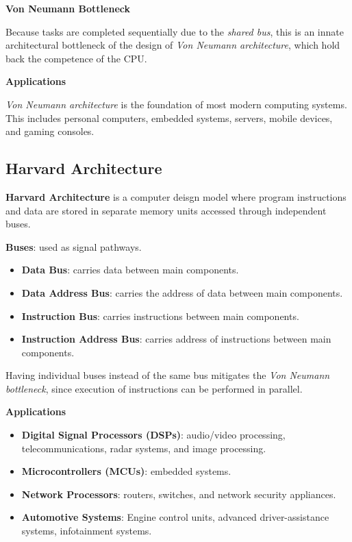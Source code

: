 \documentclass[12pt, letterpaper]{article}
\begin{document}
\textbf{Von Neumann Bottleneck}

Because tasks are completed sequentially due to the \textit{shared bus}, this is an innate architectural bottleneck of the design of \textit{Von Neumann architecture}, which hold back the competence of the CPU.
\medskip

\textbf{Applications}

\textit{Von Neumann architecture} is the foundation of most modern computing systems. This includes personal computers, embedded systems, servers, mobile devices, and gaming consoles.

\subsection*{Harvard Architecture}

\textbf{Harvard Architecture} is a computer deisgn model where program instructions and data are stored in separate memory units accessed through independent buses.
\medskip

\textbf{Buses}: used as signal pathways.

\begin{itemize}
    \item \textbf{Data Bus}: carries data between main components.
    \item \textbf{Data Address Bus}: carries the address of data between main components.
    \item \textbf{Instruction Bus}: carries instructions between main components.
    \item \textbf{Instruction Address Bus}: carries address of instructions between main components.
\end{itemize}

Having individual buses instead of the same bus mitigates the \textit{Von Neumann bottleneck}, since execution of instructions can be performed in parallel.
\medskip

\textbf{Applications}

\begin{itemize}
    \item \textbf{Digital Signal Processors (DSPs)}: audio/video processing, telecommunications, radar systems, and image processing.
    \item \textbf{Microcontrollers (MCUs)}: embedded systems.
    \item \textbf{Network Processors}: routers, switches, and network security appliances.
    \item \textbf{Automotive Systems}: Engine control units, advanced driver-assistance systems, infotainment systems.
\end{itemize}
\end{document}
